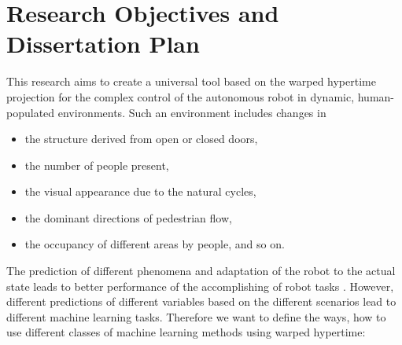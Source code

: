 \section{Research Objectives and Dissertation Plan}

This research aims to create a universal tool based on the warped hypertime projection for the complex control of the autonomous robot in dynamic, human-populated environments.
Such an environment includes changes in 
\begin{itemize}
    \item the structure derived from open or closed doors,
    \item the number of people present,
    \item the visual appearance due to the natural cycles,
    \item the dominant directions of pedestrian flow,
    \item the occupancy of different areas by people, and so on.
\end{itemize}
The prediction of different phenomena and adaptation of the robot to the actual state leads to better performance of the accomplishing of robot tasks \cite{hawes2017strands}.
However, different predictions of different variables based on the different scenarios lead to different machine learning tasks.
Therefore we want to define the ways, how to use different classes of machine learning methods using warped hypertime:
